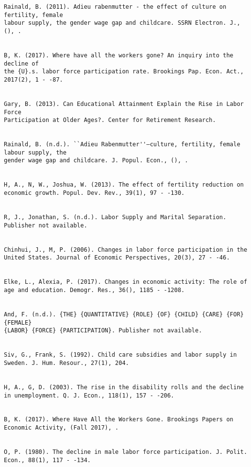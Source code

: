 \begin{verbatim}
Rainald, B. (2011). Adieu rabenmutter - the effect of culture on fertility, female
labour supply, the gender wage gap and childcare. SSRN Electron. J., (), .


B, K. (2017). Where have all the workers gone? An inquiry into the decline of
the {U}.s. labor force participation rate. Brookings Pap. Econ. Act., 2017(2), 1 - -87.


Gary, B. (2013). Can Educational Attainment Explain the Rise in Labor Force
Participation at Older Ages?. Center for Retirement Research.


Rainald, B. (n.d.). ``Adieu Rabenmutter''—culture, fertility, female labour supply, the
gender wage gap and childcare. J. Popul. Econ., (), .


H, A., N, W., Joshua, W. (2013). The effect of fertility reduction on economic growth. Popul. Dev. Rev., 39(1), 97 - -130.


R, J., Jonathan, S. (n.d.). Labor Supply and Marital Separation. Publisher not available.


Chinhui, J., M, P. (2006). Changes in labor force participation in the United States. Journal of Economic Perspectives, 20(3), 27 - -46.


Elke, L., Alexia, P. (2017). Changes in economic activity: The role of age and education. Demogr. Res., 36(), 1185 - -1208.


And, F. (n.d.). {THE} {QUANTITATIVE} {ROLE} {OF} {CHILD} {CARE} {FOR} {FEMALE}
{LABOR} {FORCE} {PARTICIPATION}. Publisher not available.


Siv, G., Frank, S. (1992). Child care subsidies and labor supply in Sweden. J. Hum. Resour., 27(1), 204.


H, A., G, D. (2003). The rise in the disability rolls and the decline in unemployment. Q. J. Econ., 118(1), 157 - -206.


B, K. (2017). Where Have All the Workers Gone. Brookings Papers on Economic Activity, (Fall 2017), .


O, P. (1980). The decline in male labor force participation. J. Polit. Econ., 88(1), 117 - -134.
\end{verbatim}